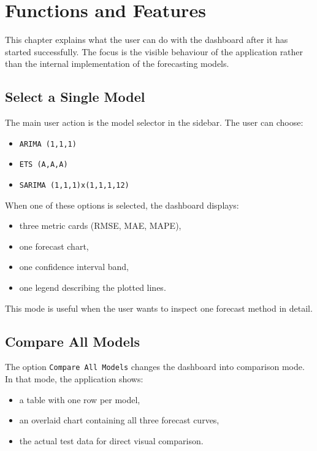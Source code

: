 %
%

\chapter{Functions and Features}
\label{ch:functions}

This chapter explains what the user can do with the dashboard after it has started successfully. The focus is the visible behaviour of the application rather than the internal implementation of the forecasting models.

\section{Select a Single Model}

The main user action is the model selector in the sidebar. The user can choose:

\begin{itemize}
    \item \texttt{ARIMA (1,1,1)}
    \item \texttt{ETS (A,A,A)}
    \item \texttt{SARIMA (1,1,1)x(1,1,1,12)}
\end{itemize}

When one of these options is selected, the dashboard displays:

\begin{itemize}
    \item three metric cards (RMSE, MAE, MAPE),
    \item one forecast chart,
    \item one confidence interval band,
    \item one legend describing the plotted lines.
\end{itemize}

This mode is useful when the user wants to inspect one forecast method in detail.

\section{Compare All Models}

The option \texttt{Compare All Models} changes the dashboard into comparison mode. In that mode, the application shows:

\begin{itemize}
    \item a table with one row per model,
    \item an overlaid chart containing all three forecast curves,
    \item the actual test data for direct visual comparison.
\end{itemize}

